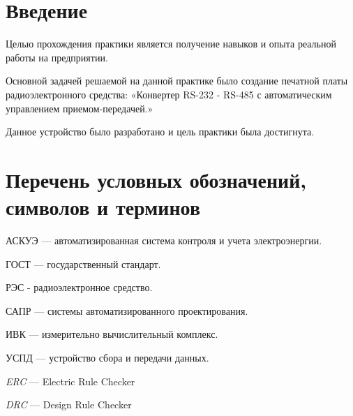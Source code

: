 \tableofcontents
\newpage

\section*{Введение}

Целью прохождения практики является получение
навыков и опыта реальной работы на предприятии.

Основной задачей решаемой на данной практике было
создание печатной платы радиоэлектронного средства:
«Конвертер RS-232 - RS-485 с автоматическим управлением приемом-передачей.»

Данное устройство было разработано и цель практики была достигнута.

\newpage

\section*{Перечень условных обозначений,
  символов и терминов}

АСКУЭ — автоматизированная система контроля и учета электроэнергии.

ГОСТ — государственный стандарт.

РЭС - радиоэлектронное средство.

САПР — системы автоматизированного проектирования.

ИВК — измерительно вычислительный комплекс.

УСПД — устройство сбора и передачи данных.

\textit{ERC} — Electric Rule Checker

\textit{DRC} — Design Rule Checker

\newpage

